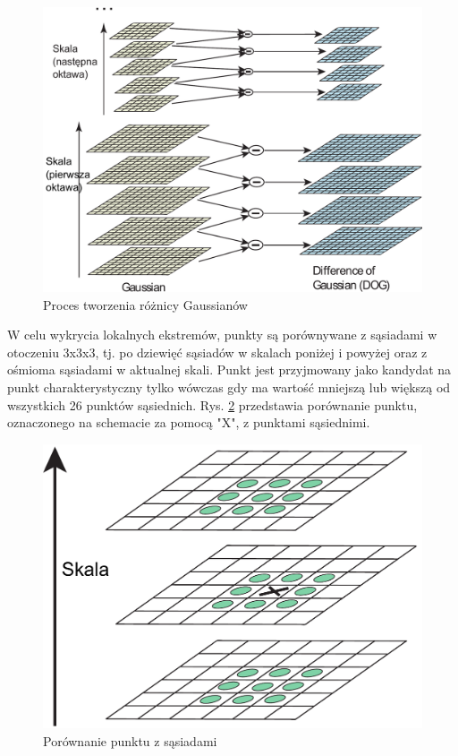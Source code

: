 \begin{figure}[h]
	\centering
	\includegraphics[scale=0.4]{graphics/01_podstawy_teoretyczne/sift-gaussian-to-dog.pdf}
	\caption{Proces tworzenia różnicy Gaussianów \cite{LOWE04}}
	\label{fig:sift-gaussian-to-dog}
\end{figure}

W celu wykrycia lokalnych ekstremów, punkty są porównywane z sąsiadami w otoczeniu 3x3x3, tj. po dziewięć sąsiadów w skalach poniżej i powyżej oraz z ośmioma sąsiadami w aktualnej skali. Punkt jest przyjmowany jako kandydat na punkt charakterystyczny tylko wówczas gdy ma wartość mniejszą lub większą od wszystkich 26 punktów sąsiednich.\cite{LOWE04} Rys. \ref{fig:sift-gaussian-min-max} przedstawia porównanie punktu, oznaczonego na schemacie za pomocą "X", z punktami sąsiednimi.

\begin{figure}[h]
	\centering
	\includegraphics[scale=0.4]{graphics/01_podstawy_teoretyczne/sift-gaussian-min-max.pdf}
	\caption{Porównanie punktu z sąsiadami \cite{LOWE04}}
	\label{fig:sift-gaussian-min-max}
\end{figure}

